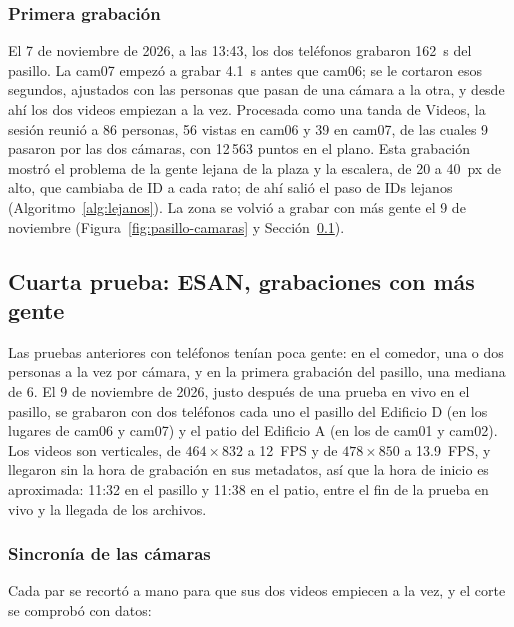 \documentclass[12pt,a4paper]{article}
\begin{document}
\subsubsection{Primera grabación}

El 7 de noviembre de 2026, a las 13:43, los dos teléfonos grabaron 162~s del
pasillo. La cam07 empezó a grabar 4.1~s antes que cam06; se le cortaron esos
segundos, ajustados con las personas que pasan de una cámara a la otra, y
desde ahí los dos videos empiezan a la vez. Procesada como una tanda de
Videos, la sesión reunió a 86 personas, 56 vistas en cam06 y 39 en cam07, de las cuales 9
pasaron por las dos cámaras, con 12\,563 puntos en el plano. Esta grabación
mostró el problema de la gente lejana de la plaza y la escalera, de 20 a
40~px de alto, que cambiaba de ID a cada rato; de ahí salió el paso de IDs
lejanos (Algoritmo~\ref{alg:lejanos}). La zona se volvió a grabar con más
gente el 9 de noviembre (Figura~\ref{fig:pasillo-camaras} y
Sección~\ref{sec:mas-gente}).

\subsection{Cuarta prueba: ESAN, grabaciones con más gente}
\label{sec:mas-gente}

Las pruebas anteriores con teléfonos tenían poca gente: en el comedor, una o
dos personas a la vez por cámara, y en la primera grabación del pasillo, una
mediana de 6. El 9 de noviembre de 2026, justo después de una prueba en vivo
en el pasillo, se grabaron con dos teléfonos cada uno el pasillo del
Edificio D (en los lugares de cam06 y cam07) y el patio del Edificio A (en
los de cam01 y cam02). Los videos son verticales, de $464 \times 832$ a
12~FPS y de $478 \times 850$ a 13.9~FPS, y llegaron sin la hora de grabación
en sus metadatos, así que la hora de inicio es aproximada: 11:32 en el
pasillo y 11:38 en el patio, entre el fin de la prueba en vivo y la llegada
de los archivos.

\subsubsection{Sincronía de las cámaras}

Cada par se recortó a mano para que sus dos videos empiecen a la vez, y el
corte se comprobó con datos:
\end{document}
